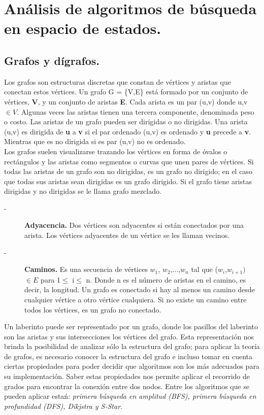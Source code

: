 \section*{Análisis de algoritmos de búsqueda en espacio de estados.}
\subsection*{Grafos y dígrafos.}
\noindent Los grafos son estructuras discretas que constan de vértices y aristas que conectan estos vértices.
Un grafo G = \{V,E\} está formado por un conjunto de vértices, \textbf{V},  y un conjunto de aristas \textbf{E}. Cada arista es un par (u,v) donde u,v $\in V$. Algunas veces las aristas tienen una tercera componente, denominada peso o costo. Las aristas de un grafo pueden ser dirigidas o no dirigidas. Una arista (u,v) es dirigida de \textbf{u} a \textbf{v} si el par ordenado (u,v) es ordenado y \textbf{u} precede a \textbf{v}. Mientras que es no dirigida si es par (u,v) no es ordenado.\\
\noindent Los grafos suelen  visualizarse trazando los vértices en forma de óvalos o rectángulos y las aristas como segmentos o curvas que unen pares de vértices. Si todas las aristas de un grafo son no dirigidas, es un grafo no dirigido; en el caso que todas sus aristas sean dirigidas es un grafo dirigido. Si el grafo tiene aristas dirigidas y no dirigidas se le llama grafo mezclado.
\begin{description}
    \item[-] \textbf{Adyacencia.} Dos vértices son adyacentes si están conectados por una arista. Los vértices adyacentes de un vértice se les llaman vecinos.
    \item[-] \textbf{Caminos.} Es una secuencia de vértices $w_{1}$, $w_{2}$,...,$w_{n}$ tal que ($w_{i}$,$w_{i+1})$ $ \in E$ para 1$\le$ i$\le$ n. Donde n es el número de aristas en el camino, es decir, la longitud. Un grafo es conectado si hay al menos un camino desde cualquier vértice a otro vértice cualquiera. Si no existe un camino entre todos los vértices, es un grafo no conectado.
\end{description}
\noindent Un laberinto puede ser representado por un grafo, donde los pasillos del laberinto son las aristas y sus intersecciones los vértices del grafo. Esta representación nos brinda la posibilidad de analizar sólo la estructura del grafo; para aplicar la teoría de grafos, es necesario conocer la estructura del grafo e incluso tomar en cuenta ciertas propiedades para poder decidir que algoritmos son los más adecuados para su implementación. Saber estas propiedades nos permite aplicar el recorrido de grados para encontrar la conexión entre dos nodos. Entre los algoritmos que se pueden aplicar estań: \textit{primera búsqueda en amplitud (BFS), primera búsqueda en profundidad (DFS), Dikjstra y S-Star}.\\

